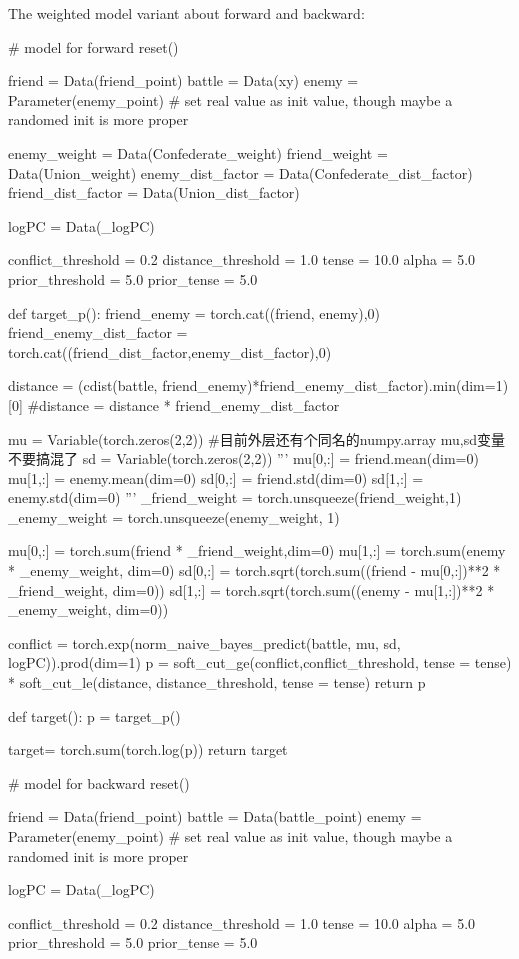 \documentclass{article}
\begin{document}
The weighted model variant about forward and backward:

\begin{python}
# model for forward
reset()

friend = Data(friend_point)
battle = Data(xy)
enemy = Parameter(enemy_point) # set real value as init value, though maybe a randomed init is more proper

enemy_weight = Data(Confederate_weight)
friend_weight = Data(Union_weight)
enemy_dist_factor = Data(Confederate_dist_factor)
friend_dist_factor = Data(Union_dist_factor)


logPC = Data(_logPC)

conflict_threshold = 0.2
distance_threshold = 1.0
tense = 10.0
alpha = 5.0
prior_threshold = 5.0
prior_tense = 5.0

def target_p():
    friend_enemy = torch.cat((friend, enemy),0)
    friend_enemy_dist_factor = torch.cat((friend_dist_factor,enemy_dist_factor),0)
    
    distance = (cdist(battle, friend_enemy)*friend_enemy_dist_factor).min(dim=1)[0]
    #distance = distance * friend_enemy_dist_factor

    mu = Variable(torch.zeros(2,2)) #目前外层还有个同名的numpy.array mu,sd变量不要搞混了
    sd = Variable(torch.zeros(2,2))
    '''
    mu[0,:] = friend.mean(dim=0)
    mu[1,:] = enemy.mean(dim=0)
    sd[0,:] = friend.std(dim=0)
    sd[1,:] = enemy.std(dim=0)
    '''
    _friend_weight = torch.unsqueeze(friend_weight,1)
    _enemy_weight  = torch.unsqueeze(enemy_weight, 1)
    
    mu[0,:] = torch.sum(friend * _friend_weight,dim=0)
    mu[1,:] = torch.sum(enemy  * _enemy_weight, dim=0)
    sd[0,:] = torch.sqrt(torch.sum((friend - mu[0,:])**2 * _friend_weight, dim=0))
    sd[1,:] = torch.sqrt(torch.sum((enemy  - mu[1,:])**2 * _enemy_weight, dim=0))
    
    conflict = torch.exp(norm_naive_bayes_predict(battle, mu, sd, logPC)).prod(dim=1)
    p = soft_cut_ge(conflict,conflict_threshold, tense = tense) * soft_cut_le(distance, distance_threshold, tense = tense)
    return p

def target():
    p = target_p()
    
    target= torch.sum(torch.log(p))
    return target
    
# model for backward
reset()

friend = Data(friend_point)
battle = Data(battle_point)
enemy = Parameter(enemy_point) # set real value as init value, though maybe a randomed init is more proper

logPC = Data(_logPC)

conflict_threshold = 0.2
distance_threshold = 1.0
tense = 10.0
alpha = 5.0
prior_threshold = 5.0
prior_tense = 5.0


\end{python}
\end{document}
